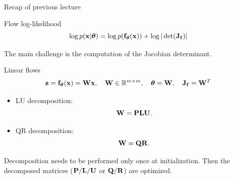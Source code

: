 \documentclass{beamer}
\begin{document}
\begin{frame}{Recap of previous lecture}
	\vspace{-0.5cm}
	\begin{block}{Flow log-likelihood}
		\vspace{-0.3cm}
		\[
			\log p(\mathbf{x}|\boldsymbol{\theta}) = \log p(\mathbf{f}_{\boldsymbol{\theta}}(\mathbf{x})) + \log  |\det (\mathbf{J}_{\mathbf{f}})|
		\]
		\vspace{-0.5cm}
	\end{block}
	The main challenge is the computation of the Jacobian determinant.
	\begin{block}{Linear flows}	
		\vspace{-0.2cm}
		\[
			\mathbf{z} = \mathbf{f}_{\boldsymbol{\theta}}(\mathbf{x}) = \mathbf{W} \mathbf{x}, \quad \mathbf{W} \in \mathbb{R}^{m \times m}, \quad \boldsymbol{\theta} = \mathbf{W}, \quad \mathbf{J}_{\mathbf{f}} = \mathbf{W}^T
		\]
	\end{block}
	\vspace{-0.3cm}
	\begin{itemize}
		\item LU decomposition:
		\[
			\mathbf{W} = \mathbf{P} \mathbf{L} \mathbf{U}.
		\]
		\item QR decomposition:
		\[
			\mathbf{W} = \mathbf{Q} \mathbf{R}.
		\]
	\end{itemize}
	Decomposition needs to be performed only once at initialization. Then the decomposed matrices ($\mathbf{P}/\mathbf{L}/\mathbf{U}$ or $\mathbf{Q}/\mathbf{R}$) are optimized.
\end{frame}
\end{document}
